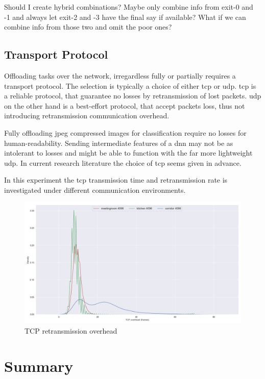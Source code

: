 Should I create hybrid combinations? Maybe only combine info from exit-0 and -1 and always let exit-2 and -3 have the final say if available? What if we can combine info from those two and omit the poor ones? 

\subsection{Transport Protocol} 

Offloading tasks over the network, irregardless fully or partially requires a transport protocol. The selection is typically a choice of either \gls{tcp} or \gls{udp}. \gls{tcp} is a reliable protocol, that guarantee no losses by retransmission of lost packets. \gls{udp} on the other hand is a best-effort protocol, that accept packets loss, thus not introducing retransmission communication overhead. 


Fully offloading \gls{jpeg} compressed images for classification require no losses for human-readability. Sending intermediate features of a \gls{dnn} may not be as intolerant to losses and might be able to function with the far more lightweight \gls{udp}. In current research literature the choice of \gls{tcp} seems given in advance.  

In this experiment the \gls{tcp} transmission time and retransmission rate is investigated under different communication environments. 

\begin{figure}
	\centering
	\includegraphics[width=\linewidth]{figures/tcp/tcpoverhead}
	\caption[TCP retransmission overhead]{TCP retransmission overhead}
\end{figure}

\section{Summary}

